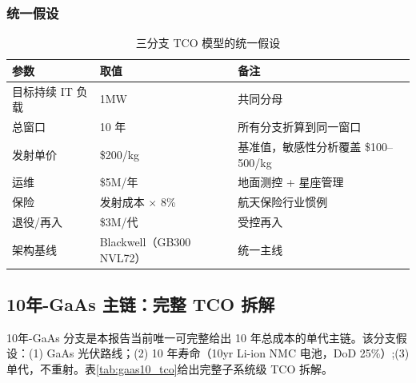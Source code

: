 \subsubsection{统一假设}

\begin{table}[H]
\centering
\caption{三分支 TCO 模型的统一假设}
\label{tab:unified_assumptions}
\begin{tabular}{p{5.0cm}p{4.0cm}p{4.0cm}}
\toprule
\textbf{参数} & \textbf{取值} & \textbf{备注} \\
\midrule
目标持续 IT 负载   & 1\;MW              & 共同分母 \\
总窗口             & 10 年              & 所有分支折算到同一窗口 \\
发射单价           & \$200/kg           & 基准值，敏感性分析覆盖 \$100--500/kg \\
运维               & \$5M/年            & 地面测控 + 星座管理 \\
保险               & 发射成本 $\times$ 8\% & 航天保险行业惯例 \\
退役/再入          & \$3M/代            & 受控再入 \\
架构基线           & Blackwell（GB300 NVL72） & 统一主线 \\
\bottomrule
\end{tabular}
\end{table}

\subsection{10年-GaAs 主链：完整 TCO 拆解}

10年-GaAs 分支是本报告当前唯一可完整给出 10 年总成本的单代主链。该分支假设：(1) GaAs 光伏路线；(2) 10 年寿命（10yr Li-ion NMC 电池，DoD 25\%）;(3) 单代，不重射。表\ref{tab:gaas10_tco}给出完整子系统级 TCO 拆解。

